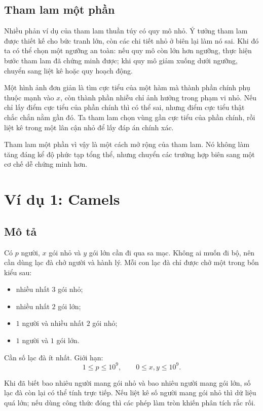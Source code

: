 \documentclass[11pt]{article}
\begin{document}
\subsection{Tham lam một phần}

Nhiều phản ví dụ của tham lam thuần túy có quy mô nhỏ. Ý tưởng tham lam được
thiết kế cho bức tranh lớn, còn các chi tiết nhỏ ở biên lại làm nó sai. Khi
đó ta có thể chọn một ngưỡng an toàn: nếu quy mô còn lớn hơn ngưỡng, thực hiện
bước tham lam đã chứng minh được; khi quy mô giảm xuống dưới ngưỡng, chuyển
sang liệt kê hoặc quy hoạch động.

Một hình ảnh đơn giản là tìm cực tiểu của một hàm mà thành phần chính phụ
thuộc mạnh vào \(x\), còn thành phần nhiễu chỉ ảnh hưởng trong phạm vi nhỏ.
Nếu chỉ lấy điểm cực tiểu của phần chính thì có thể sai, nhưng điểm cực tiểu
thật chắc chắn nằm gần đó. Ta tham lam chọn vùng gần cực tiểu của phần chính,
rồi liệt kê trong một lân cận nhỏ để lấy đáp án chính xác.

Tham lam một phần vì vậy là một cách mở rộng của tham lam. Nó không làm tăng
đáng kể độ phức tạp tổng thể, nhưng chuyển các trường hợp biên sang một cơ
chế dễ chứng minh hơn.

\section{Ví dụ 1: Camels}

\subsection{Mô tả}

Có \(p\) người, \(x\) gói nhỏ và \(y\) gói lớn cần đi qua sa mạc. Không ai
muốn đi bộ, nên cần dùng lạc đà chở người và hành lý. Mỗi con lạc đà chỉ được
chở một trong bốn kiểu sau:
\begin{itemize}
  \item nhiều nhất \(3\) gói nhỏ;
  \item nhiều nhất \(2\) gói lớn;
  \item \(1\) người và nhiều nhất \(2\) gói nhỏ;
  \item \(1\) người và \(1\) gói lớn.
\end{itemize}
Cần số lạc đà ít nhất. Giới hạn:
\[
  1\le p\le 10^9,\qquad 0\le x,y\le 10^9.
\]

Khi đã biết bao nhiêu người mang gói nhỏ và bao nhiêu người mang gói lớn, số
lạc đà còn lại có thể tính trực tiếp. Nếu liệt kê số người mang gói nhỏ thì
dữ liệu quá lớn; nếu dùng công thức đóng thì các phép làm tròn khiến phân
tích rắc rối.
\end{document}
